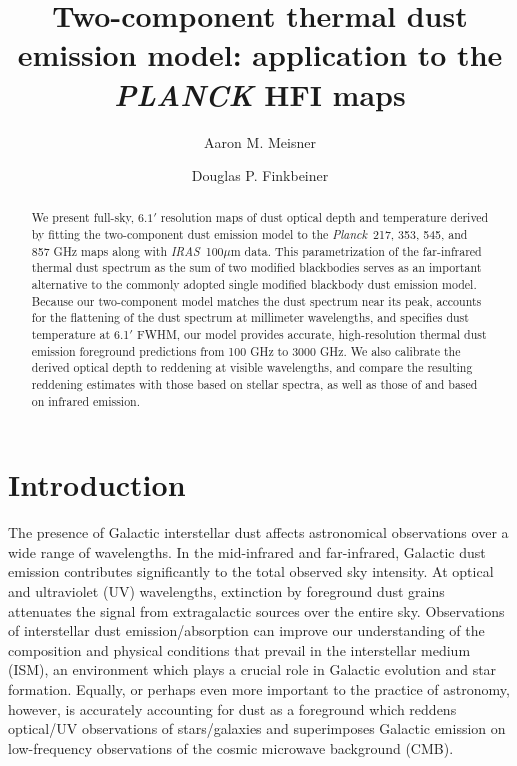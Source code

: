 \documentclass{emulateapj}
\newcommand{\IRAS}{{\it IRAS}}
\newcommand{\PLANCK}{{\it Planck}}
\begin{document}
\title{Two-component thermal dust emission model: application to the 
{\it PLANCK} HFI maps}
\author{Aaron M. Meisner}
\author{Douglas P. Finkbeiner}

\begin{abstract}
We present full-sky, $6.1'$ resolution maps of dust optical depth and 
temperature derived by fitting the \cite{FDS99} two-component dust emission 
model to the \PLANCK~217, 353, 545, and 857 GHz maps along with  
\IRAS~100$\mu$m data. This parametrization of the far-infrared thermal dust 
spectrum as the sum of two modified blackbodies serves as an important 
alternative to the commonly adopted single modified blackbody dust emission 
model. Because our two-component model matches the dust spectrum near its 
peak, accounts for the flattening of the dust spectrum at millimeter 
wavelengths, and specifies dust temperature at 6.1$'$ FWHM, our model 
provides accurate, high-resolution thermal dust emission foreground predictions
from 100 GHz to 3000 GHz. We also calibrate the derived optical depth to 
reddening at visible wavelengths, and compare the resulting reddening estimates
with those based on stellar spectra, as well as those of \cite{SFD} and 
\cite{planckdust} based on infrared emission.




\end{abstract}

\section{Introduction}
The presence of Galactic interstellar dust affects
astronomical observations over a wide range of wavelengths. In the mid-infrared
and far-infrared, Galactic dust emission contributes significantly
to the total observed sky intensity. At optical and ultraviolet (UV) 
wavelengths, extinction by foreground dust grains attenuates the signal from 
extragalactic sources over the entire sky. Observations of interstellar dust 
emission/absorption can improve our understanding of the composition and 
physical conditions that prevail in the interstellar medium (ISM), an 
environment which plays a crucial role in Galactic evolution and star 
formation. Equally, or perhaps even more important to the practice of 
astronomy, however, is accurately accounting for dust as a foreground which 
reddens optical/UV observations of stars/galaxies and superimposes Galactic 
emission on low-frequency observations of the cosmic microwave background 
(CMB). 
\end{document}
